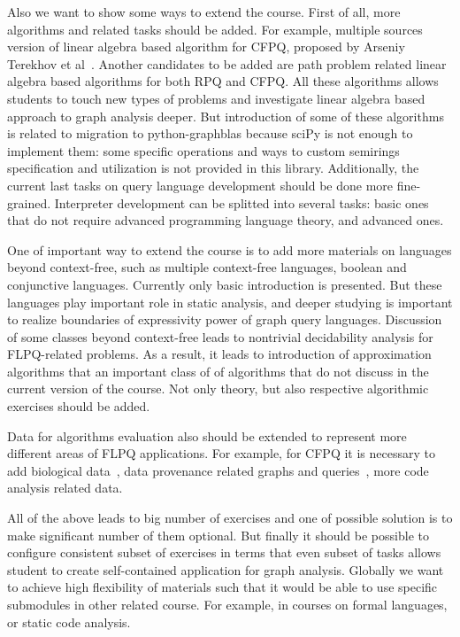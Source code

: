 \documentclass[sigconf]{acmart}
\begin{document}
Also we want to show some ways to extend the course. 
First of all, more algorithms and related tasks should be added.
For example, multiple sources version of linear algebra based algorithm for CFPQ, proposed by Arseniy Terekhov et al~\cite{terekhov2021multiple}.
Another candidates to be added are path problem related linear algebra based algorithms for both RPQ and CFPQ.
All these algorithms allows students to touch new types of problems and investigate linear algebra based approach to graph analysis deeper.
But introduction of some of these algorithms is related to migration to python-graphblas because sciPy is not enough to implement them: some specific operations and ways to custom semirings specification and utilization is not provided in this library.
Additionally, the current last tasks on query language development should be done more fine-grained. 
Interpreter development can be splitted into several tasks: basic ones that do not require advanced programming language theory, and advanced ones.

One of important way to extend the course is to add more materials on languages beyond context-free, such as multiple context-free languages, boolean and conjunctive languages. 
Currently only basic introduction is presented. 
But these languages play important role in static analysis, and deeper studying is important to realize boundaries of expressivity power of graph query languages.
Discussion of some classes beyond context-free leads to nontrivial decidability analysis for FLPQ-related problems.
As a result, it leads to introduction of approximation algorithms that an important class of of algorithms that do not discuss in the current version of the course.
Not only theory, but also respective algorithmic exercises should be added.

Data for algorithms evaluation also should be extended to represent more different areas of FLPQ applications.
For example, for CFPQ it is necessary to add biological data~\cite{SevonEronen+2008+157+172}, data provenance related graphs and queries~\cite{8731467}, more code analysis related data.

All of the above leads to big number of exercises and one of possible solution is to make significant number of them optional.
But finally it should be possible to configure consistent subset of exercises in terms that even subset of tasks allows student to create self-contained application for graph analysis.
Globally we want to achieve high flexibility of materials such that it would be able to use specific submodules in other related course.
For example, in courses on formal languages, or static code analysis.




\end{document}
